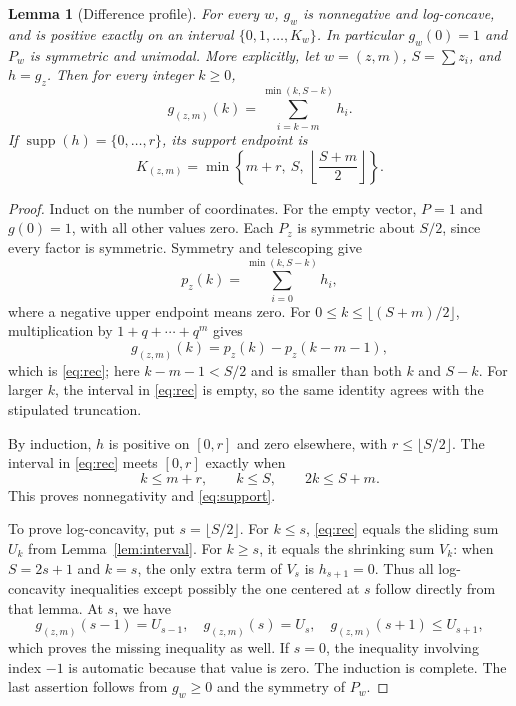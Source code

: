 \documentclass[11pt]{article}
\newtheorem{lemma}{Lemma}
\newcommand{\supp}{\operatorname{supp}}
\begin{document}
\begin{lemma}[Difference profile]\label{lem:g}
For every $w$, $g_w$ is nonnegative and log-concave, and is positive exactly
on an interval $\{0,1,\ldots,K_w\}$. In particular $g_w(0)=1$ and $P_w$
is symmetric and unimodal.
More explicitly, let $w=(z,m)$, $S=\sum z_i$, and $h=g_z$. Then for every
integer $k\ge0$,
\begin{equation}\label{eq:rec}
 g_{(z,m)}(k)=\sum_{i=k-m}^{\min(k,S-k)}h_i.
\end{equation}
If $\supp(h)=\{0,\ldots,r\}$, its support endpoint is
\begin{equation}\label{eq:support}
 K_{(z,m)}=\min\left\{m+r,\ S,\ \left\lfloor\frac{S+m}{2}\right\rfloor\right\}.
\end{equation}
\end{lemma}
\begin{proof}
Induct on the number of coordinates. For the empty vector, $P=1$ and
$g(0)=1$, with all other values zero. Each $P_z$ is symmetric about $S/2$,
since every factor is symmetric. Symmetry and telescoping give
\[
 p_z(k)=\sum_{i=0}^{\min(k,S-k)}h_i,
\]
where a negative upper endpoint means zero. For
$0\le k\le\lfloor(S+m)/2\rfloor$, multiplication by
$1+q+\cdots+q^m$ gives
\[
 g_{(z,m)}(k)=p_z(k)-p_z(k-m-1),
\]
which is \eqref{eq:rec}; here $k-m-1<S/2$ and is smaller than both
$k$ and $S-k$. For larger $k$, the interval in \eqref{eq:rec} is empty,
so the same identity agrees with the stipulated truncation.

By induction, $h$ is positive on $[0,r]$ and zero elsewhere, with
$r\le\lfloor S/2\rfloor$. The interval in \eqref{eq:rec} meets $[0,r]$
exactly when
\[
 k\le m+r,\qquad k\le S,\qquad 2k\le S+m.
\]
This proves nonnegativity and \eqref{eq:support}.

To prove log-concavity, put $s=\lfloor S/2\rfloor$.
For $k\le s$, \eqref{eq:rec} equals the sliding sum $U_k$ from
Lemma~\ref{lem:interval}. For $k\ge s$, it equals the shrinking sum $V_k$:
when $S=2s+1$ and $k=s$, the only extra term of $V_s$ is $h_{s+1}=0$.
Thus all log-concavity inequalities except possibly the one centered at
$s$ follow directly from that lemma. At $s$, we have
\[
 g_{(z,m)}(s-1)=U_{s-1},\quad g_{(z,m)}(s)=U_s,
 \quad g_{(z,m)}(s+1)\le U_{s+1},
\]
which proves the missing inequality as well. If $s=0$, the inequality
involving index $-1$ is automatic because that value is zero.
The induction is complete. The last assertion follows from $g_w\ge0$
and the symmetry of $P_w$.
\end{proof}
\end{document}
